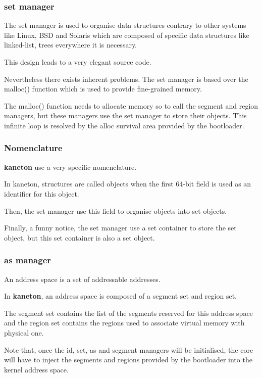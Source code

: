 
\begin{frame}
  \frametitle{set manager}

  The set manager is used to organise data structures contrary to other
  systems like Linux, BSD and Solaris which are composed of specific
  data structures like linked-list, trees everywhere it is necessary.

  \nl

  This design leads to a very elegant source code.

  \nl

  Nevertheless there exists inherent problems. The set manager is based
  over the malloc() function which is used to provide fine-grained memory.

  \nl

  The malloc() function needs to allocate memory so to call the segment
  and region managers, but these managers use the set manager to store their
  objects. This infinite loop is resolved by the alloc survival area provided
  by the bootloader.
\end{frame}


\begin{frame}
  \frametitle{Nomenclature}

  \textbf{kaneton} use a very specific nomenclature.

  \nl

  In kaneton, structures are called objects when the first 64-bit field
  is used as an identifier for this object.

  \nl

  Then, the set manager use this field to organise objects into set objects.

  \nl

  Finally, a funny notice, the set manager use a set container to store
  the set object, but this set container is also a set object.
\end{frame}


\begin{frame}
  \frametitle{as manager}

  An address space is a set of addressable addresses.

  \nl

  In \textbf{kaneton}, an address space is composed of a segment set and
  region set.

  \nl

  The segment set contains the list of the segments reserved
  for this address space and the region set contains the regions used
  to associate virtual memory with physical one.

  \nl

  Note that, once the id, set, as and segment managers will be initialised,
  the core will have to inject the segments and regions provided by the
  bootloader into the kernel address space.
\end{frame}

